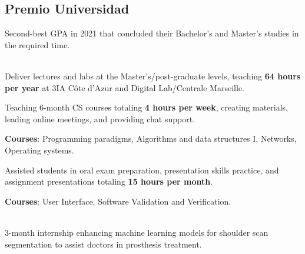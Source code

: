 \documentclass[a4paper]{MagicalCV}
\begin{document}
\begin{minipage}[t]{0.36\textwidth}
\subsection{Premio Universidad}
\vspace{\topsep} %
\href{https://www.unc.edu.ar/comunicaci\%C3\%B3n/premios-universidad-la-unc-distingui\%C3\%B3-las-personas-con-mejores-promedios-que-egresaron}{\faLink} Second-best GPA in 2021 that concluded their Bachelor's and Master's studies in the required time.

\end{minipage} 
\hfill
\begin{minipage}[t]{0.60\textwidth} 


 \\
\vspace{\topsep} %
Deliver lectures and labs at the Master's/post-graduate levels, teaching \textbf{64 hours per year} at 3IA Côte d’Azur and Digital Lab/Centrale Marseille.
\sectionsep

\vspace{\topsep} %
Teaching 6-month CS courses totaling \textbf{4 hours per week}, creating materials, leading online meetings, and providing chat support.

\textbf{Courses}: Programming paradigms, Algorithms and data structures I, Networks, Operating systems.
\sectionsep

\vspace{\topsep} %
Assisted students in oral exam preparation, presentation skills practice, and assignment presentations totaling \textbf{15 hours per month}.

\textbf{Courses}: User Interface, Software Validation and Verification.
\sectionsep

 \\
\vspace{\topsep} %
3-month internship enhancing machine learning models for shoulder scan segmentation to assist doctors in prosthesis treatment.


\end{minipage}
\end{document}
